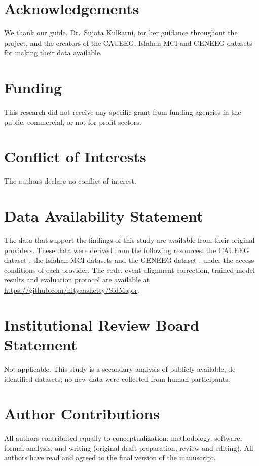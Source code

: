 
\section{Acknowledgements}
We thank our guide, Dr.\ Sujata Kulkarni, for her guidance throughout the project, and the creators of the
CAUEEG, Isfahan MCI and GENEEG datasets for making their data available.

\section{Funding}
This research did not receive any specific grant from funding agencies in the public, commercial, or
not-for-profit sectors.

\section{Conflict of Interests}
The authors declare no conflict of interest.

\section{Data Availability Statement}
The data that support the findings of this study are available from their original providers. These data were
derived from the following resources: the CAUEEG dataset \citep{kim2023caueeg}, the Isfahan MCI datasets
\citep{kashefpoor2016automatic,kashefpoor2019supervised} and the GENEEG dataset \citep{geneeg2025}, under the
access conditions of each provider. The code, event-alignment correction, trained-model results and evaluation protocol are available at
\url{https://github.com/nityaashetty/SidMajor}.

\section{Institutional Review Board Statement}
Not applicable. This study is a secondary analysis of publicly available, de-identified datasets; no new data
were collected from human participants.

\section{Author Contributions}
All authors contributed equally to conceptualization, methodology, software, formal analysis, and writing
(original draft preparation, review and editing). All authors have read and agreed to the final version of
the manuscript.
